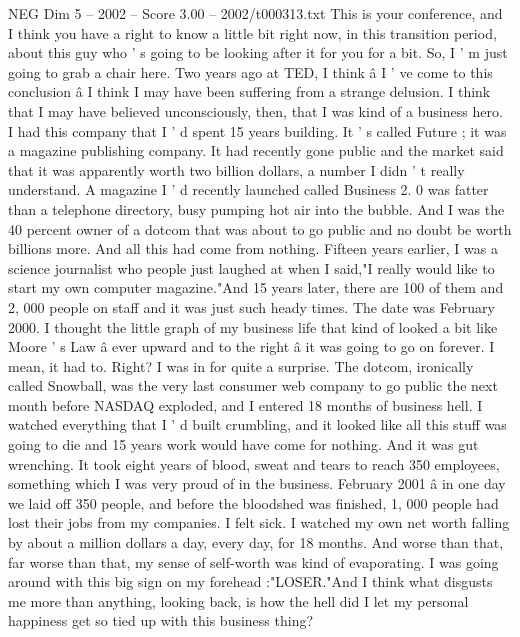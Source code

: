 \begin{textsample}{NEG Dim 5 – 2002 – Score 3.00 – 2002/t000313.txt}  \label{ex:f5_neg_080}
This is your conference, and I think you have a right to know a little bit right now, in this transition period, about this guy who ' s going to be looking after it for you for a bit.
So, I ' m just going to grab a chair here.
Two years ago at TED, I think â I ' ve come to this conclusion â I think I may have been suffering from a strange delusion.
I think that I may have believed unconsciously, then, that I was kind of a business hero.
I had this company that I ' d spent 15 years building.
It ' s called Future ; it was a magazine publishing company.
It had recently gone public and the market said that it was apparently worth two billion dollars, a number I didn ' t really understand.
A magazine I ' d recently launched called Business 2. 0 was fatter than a telephone directory, busy pumping hot air into the bubble.
And I was the 40 percent owner of a dotcom that was about to go public and no doubt be worth billions more.
And all this had come from nothing.
Fifteen years earlier, I was a science journalist who people just laughed at when I said,"I really would like to start my own computer magazine."And 15 years later, there are 100 of them and 2, 000 people on staff and it was just such heady times.
The date was February 2000.
I thought the little graph of my business life that kind of looked a bit like Moore ' s Law â ever upward and to the right â it was going to go on forever.
I mean, it had to.
Right?
I was in for quite a surprise.
The dotcom, ironically called Snowball, was the very last consumer web company to go public the next month before NASDAQ exploded, and I entered 18 months of business hell.
I watched everything that I ' d built crumbling, and it looked like all this stuff was going to die and 15 years work would have come for nothing.
And it was gut wrenching.
It took eight years of blood, sweat and tears to reach 350 employees, something which I was very proud of in the business.
February 2001 â in one day we laid off 350 people, and before the bloodshed was finished, 1, 000 people had lost their jobs from my companies.
I felt sick.
I watched my own net worth falling by about a million dollars a day, every day, for 18 months.
And worse than that, far worse than that, my sense of self-worth was kind of evaporating.
I was going around with this big sign on my forehead :"LOSER."And I think what disgusts me more than anything, looking back, is how the hell did I let my personal happiness get so tied up with this business thing?

\end{textsample}
